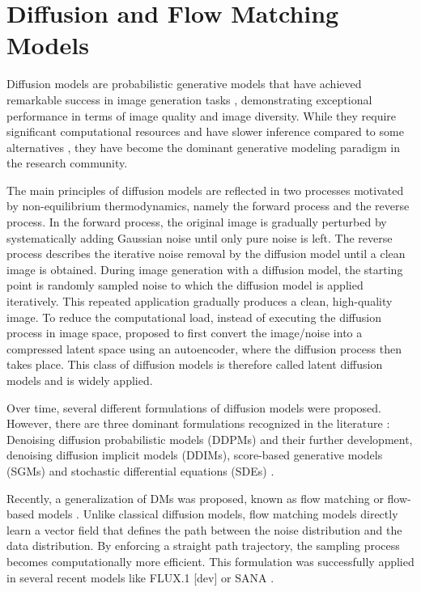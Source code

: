 \section{Diffusion and Flow Matching Models}
\label{sec:diffModel}
Diffusion models \cite{DMBeginning, DDPM, DDIM, LDM, SGM, SDE} are probabilistic generative models  that have achieved remarkable success in image generation tasks \cite{Flux, HiDream}, demonstrating exceptional performance in terms of image quality and image diversity. While they require significant computational resources and have slower inference compared to some alternatives \cite{VAE, NormalizingFlow, GAN}, they have become the dominant generative modeling paradigm in the research community.

The main principles of diffusion models are reflected in two processes motivated by non-equilibrium thermodynamics, namely the forward process and the reverse process. In the forward process, the original image is gradually perturbed by systematically adding Gaussian noise until only pure noise is left. The reverse process describes the iterative noise removal by the diffusion model until a clean image is obtained. During image generation with a diffusion model, the starting point is randomly sampled noise to which the diffusion model is applied iteratively. This repeated application gradually produces a clean, high-quality image. To reduce the computational load, instead of executing the diffusion process in image space, \cite{LDM} proposed to first convert the image/noise into a compressed latent space using an autoencoder, where the diffusion process then takes place. This class of diffusion models is therefore called latent diffusion models and is widely applied. 

Over time, several different formulations of diffusion models were proposed. However, there are three dominant formulations recognized in the literature \cite{SurveyDM}: Denoising diffusion probabilistic models (\gls{DDPM}s) \cite{DMBeginning, DDPM} and their further development, denoising diffusion implicit models (\gls{DDIM}s), score-based generative models (\gls{SGM}s) \cite{SGM} and stochastic differential equations (\gls{SDE}s) \cite{SDE}. 

 Recently, a generalization of DMs was proposed, known as flow matching or flow-based models \cite{RectifiedFlowMatching, FlowMatching}. Unlike classical diffusion models, flow  matching models directly learn a vector field that defines the path between the noise distribution and the data distribution. By enforcing a straight path trajectory, the sampling process becomes computationally more efficient. This formulation was successfully applied in several recent models like FLUX.1 [dev] \cite{Flux} or SANA \cite{Sana}.\\
 
